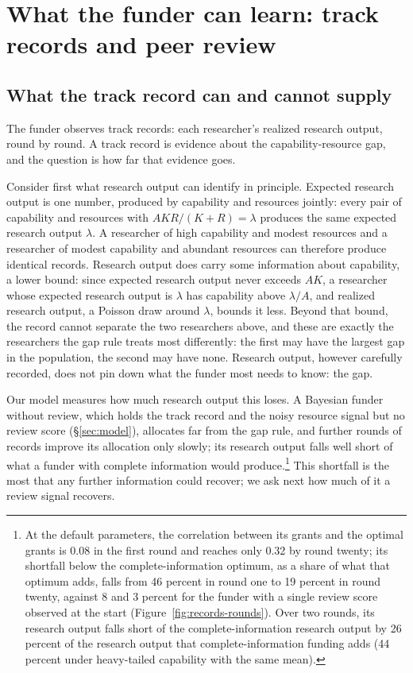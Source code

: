 \documentclass[article, 11pt, reqno]{amsart}
\theoremstyle{named}
\begin{document}
\section{What the funder can learn: track records and peer review}\label{sec:review}

\subsection*{What the track record can and cannot supply}\label{sec:records}

The funder observes track records: each researcher's realized research output, round by round. A track record is evidence about the capability-resource gap, and the question is how far that evidence goes.

Consider first what research output can identify in principle. Expected research output is one number, produced by capability and resources jointly: every pair of capability and resources with $AKR/(K+R) = \lambda$ produces the same expected research output $\lambda$. A researcher of high capability and modest resources and a researcher of modest capability and abundant resources can therefore produce identical records. Research output does carry some information about capability, a lower bound: since expected research output never exceeds $AK$, a researcher whose expected research output is $\lambda$ has capability above $\lambda/A$, and realized research output, a Poisson draw around $\lambda$, bounds it less. Beyond that bound, the record cannot separate the two researchers above, and these are exactly the researchers the gap rule treats most differently: the first may have the largest gap in the population, the second may have none. Research output, however carefully recorded, does not pin down what the funder most needs to know: the gap.

Our model measures how much research output this loses. A Bayesian funder without review, which holds the track record and the noisy resource signal but no review score (\S\ref{sec:model}), allocates far from the gap rule, and further rounds of records improve its allocation only slowly; its research output falls well short of what a funder with complete information would produce.\footnote{At the default parameters, the correlation between its grants and the optimal grants is 0.08 in the first round and reaches only 0.32 by round twenty; its shortfall below the complete-information optimum, as a share of what that optimum adds, falls from 46 percent in round one to 19 percent in round twenty, against 8 and 3 percent for the funder with a single review score observed at the start (Figure~\ref{fig:records-rounds}). Over two rounds, its research output falls short of the complete-information research output by 26 percent of the research output that complete-information funding adds (44 percent under heavy-tailed capability with the same mean).} This shortfall is the most that any further information could recover; we ask next how much of it a review signal recovers.
\end{document}
